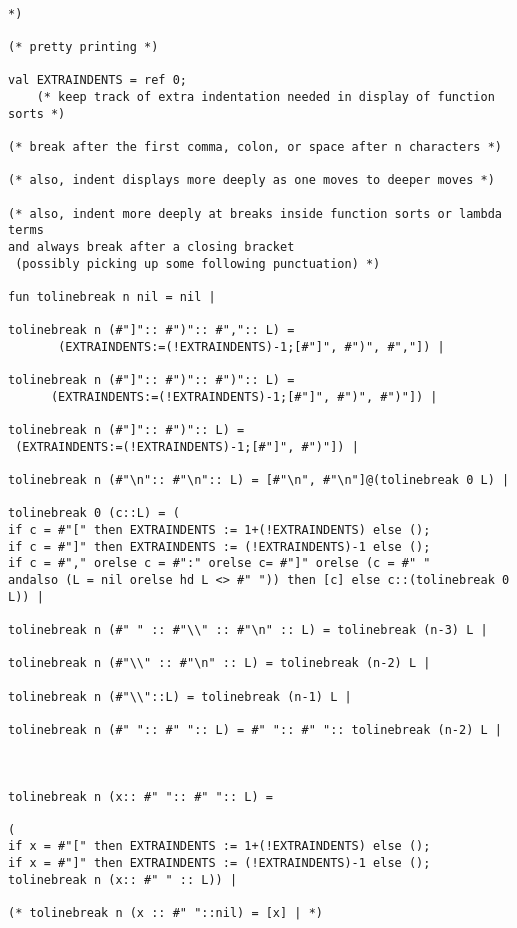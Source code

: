 \documentclass{article}
\begin{document}
\begin{verbatim}

*)

(* pretty printing *)

val EXTRAINDENTS = ref 0;  
    (* keep track of extra indentation needed in display of function sorts *)

(* break after the first comma, colon, or space after n characters *)

(* also, indent displays more deeply as one moves to deeper moves *)

(* also, indent more deeply at breaks inside function sorts or lambda terms
and always break after a closing bracket
 (possibly picking up some following punctuation) *)

fun tolinebreak n nil = nil |

tolinebreak n (#"]":: #")":: #",":: L) =
       (EXTRAINDENTS:=(!EXTRAINDENTS)-1;[#"]", #")", #","]) |

tolinebreak n (#"]":: #")":: #")":: L) = 
      (EXTRAINDENTS:=(!EXTRAINDENTS)-1;[#"]", #")", #")"]) |

tolinebreak n (#"]":: #")":: L) =
 (EXTRAINDENTS:=(!EXTRAINDENTS)-1;[#"]", #")"]) |

tolinebreak n (#"\n":: #"\n":: L) = [#"\n", #"\n"]@(tolinebreak 0 L) |

tolinebreak 0 (c::L) = (
if c = #"[" then EXTRAINDENTS := 1+(!EXTRAINDENTS) else ();
if c = #"]" then EXTRAINDENTS := (!EXTRAINDENTS)-1 else ();
if c = #"," orelse c = #":" orelse c= #"]" orelse (c = #" " 
andalso (L = nil orelse hd L <> #" ")) then [c] else c::(tolinebreak 0 L)) |

tolinebreak n (#" " :: #"\\" :: #"\n" :: L) = tolinebreak (n-3) L |

tolinebreak n (#"\\" :: #"\n" :: L) = tolinebreak (n-2) L |

tolinebreak n (#"\\"::L) = tolinebreak (n-1) L | 

tolinebreak n (#" ":: #" ":: L) = #" ":: #" ":: tolinebreak (n-2) L |



tolinebreak n (x:: #" ":: #" ":: L) = 

(
if x = #"[" then EXTRAINDENTS := 1+(!EXTRAINDENTS) else ();
if x = #"]" then EXTRAINDENTS := (!EXTRAINDENTS)-1 else ();
tolinebreak n (x:: #" " :: L)) |

(* tolinebreak n (x :: #" "::nil) = [x] | *)



\end{verbatim}
\end{document}
